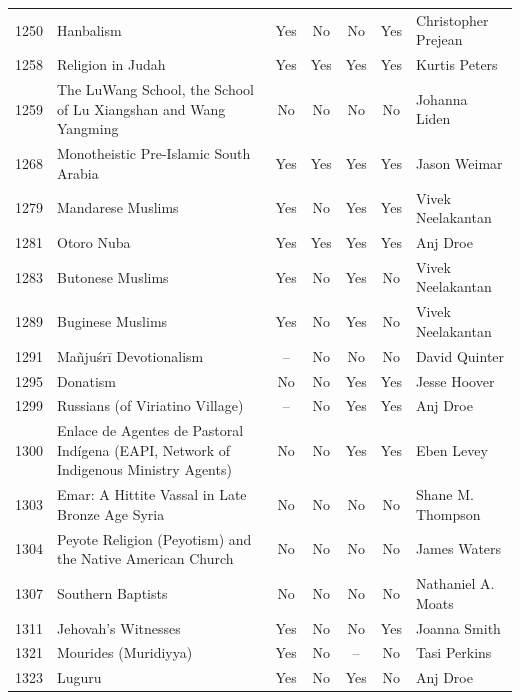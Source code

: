 {\begin{longtable}{rp{3.5cm}ccccp{3cm}}
1250 & {\raggedright Hanbalism} & Yes & No & No & Yes & {\raggedright Christopher Prejean} \\
1258 & {\raggedright Religion in Judah} & Yes & Yes & Yes & Yes & {\raggedright Kurtis Peters} \\
1259 & {\raggedright The LuWang School, the School of Lu Xiangshan and Wang Yangming} & No & No & No & No & {\raggedright Johanna Liden} \\
1268 & {\raggedright Monotheistic Pre-Islamic South Arabia} & Yes & Yes & Yes & Yes & {\raggedright Jason Weimar} \\
1279 & {\raggedright Mandarese Muslims} & Yes & No & Yes & Yes & {\raggedright Vivek Neelakantan} \\
1281 & {\raggedright Otoro Nuba} & Yes & Yes & Yes & Yes & {\raggedright Anj Droe} \\
1283 & {\raggedright Butonese Muslims} & Yes & No & Yes & No & {\raggedright Vivek Neelakantan} \\
1289 & {\raggedright Buginese Muslims} & Yes & No & Yes & No & {\raggedright Vivek Neelakantan} \\
1291 & {\raggedright Mañjuśrī Devotionalism} & -- & No & No & No & {\raggedright David Quinter} \\
1295 & {\raggedright Donatism} & No & No & Yes & Yes & {\raggedright Jesse Hoover} \\
1299 & {\raggedright Russians (of Viriatino Village)} & -- & No & Yes & Yes & {\raggedright Anj Droe} \\
1300 & {\raggedright Enlace de Agentes de Pastoral Indígena (EAPI, Network of Indigenous Ministry Agents)} & No & No & Yes & Yes & {\raggedright Eben Levey} \\
1303 & {\raggedright Emar: A Hittite Vassal in Late Bronze Age Syria} & No & No & No & No & {\raggedright Shane M. Thompson} \\
1304 & {\raggedright Peyote Religion (Peyotism) and the Native American Church} & No & No & No & No & {\raggedright James Waters} \\
1307 & {\raggedright Southern Baptists} & No & No & No & No & {\raggedright Nathaniel A. Moats} \\
1311 & {\raggedright Jehovah's Witnesses} & Yes & No & No & Yes & {\raggedright Joanna Smith} \\
1321 & {\raggedright Mourides (Muridiyya)} & Yes & No & -- & No & {\raggedright Tasi Perkins} \\
1323 & {\raggedright Luguru} & Yes & No & Yes & No & {\raggedright Anj Droe} \\

\end{longtable}}

